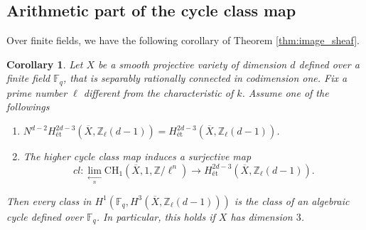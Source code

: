 \documentclass{amsart}
\newtheorem{cor}[theorem]{Corollary}
\theoremstyle{definition}
\theoremstyle{remark}
\newcommand{\mbb}{\mathbb}
\newcommand{\FF}{\mbb{F}}
\newcommand{\ZZ}{\mbb{Z}}
\newcommand{\et}{\text{\'et}}
\begin{document}
\subsection{Arithmetic part of the cycle class map}
Over finite fields, we have the following corollary of Theorem \ref{thm:image_sheaf}.

\begin{cor}\label{cor:IHC}
Let $X$ be a smooth projective  variety of dimension $d$ defined over a finite field $\mathbb{F}_q$, that is separably rationally connected in codimension one.
Fix a prime number $\ell$ different from the characteristic of $k$. 
Assume one of the followings
\begin{enumerate}
    \item $N^{d-2}H_\et^{2d-3}(\overline{X}, \ZZ_\ell(d-1))=H_\et^{2d-3}(\overline{X}, \ZZ_\ell(d-1))$.
    \item The higher cycle class map induces a surjective map
\[
cl: \lim \limits_{\xleftarrow[n]{}}\text{CH}_1(\overline{X}, 1, \ZZ/\ell^n) \to H^{2d-3}_{\text{\'et}}(\overline{X}, \ZZ_\ell(d-1)).
\]

\end{enumerate}
Then every class in $H^1(\FF_q, H^3(\overline{X}, \ZZ_\ell(d-1)))$ is the class of an algebraic cycle defined over $\FF_q$.
In particular, this holds if $X$ has dimension $3$.
\end{cor}
\end{document}
